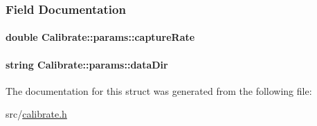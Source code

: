 \subsubsection{\-Field \-Documentation}
\hypertarget{structCalibrate_1_1params_a56c34ddc4c233c7fe1d42b9f28c712ed}{
\paragraph[{capture\-Rate}]{\setlength{\rightskip}{0pt plus 5cm}double {\bf \-Calibrate\-::params\-::capture\-Rate}}}\label{structCalibrate_1_1params_a56c34ddc4c233c7fe1d42b9f28c712ed}
\hypertarget{structCalibrate_1_1params_a132084ddaaaf07b9687da1c6cb508726}{
\paragraph[{data\-Dir}]{\setlength{\rightskip}{0pt plus 5cm}string {\bf \-Calibrate\-::params\-::data\-Dir}}}\label{structCalibrate_1_1params_a132084ddaaaf07b9687da1c6cb508726}


\-The documentation for this struct was generated from the following file\-:\begin{DoxyCompactItemize}
\item 
src/\hyperlink{calibrate_8h}{calibrate.\-h}\end{DoxyCompactItemize}
